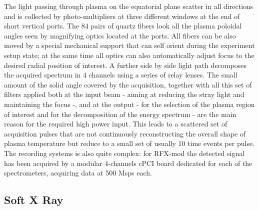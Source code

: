 The light passing through plasma on the equatorial plane scatter in all directions and is collected by photo-multipliers at three different windows at the end of short vertical ports. The 84 pairs of quartz fibers look all the plasma poloidal angles seen by magnifying optics located at the ports. All fibers can be also moved by a special mechanical support that can self orient during the experiment setup state; at the same time all optics can also automatically adjust focus to the desired radial position of interest.
A further side by side light path decomposes the acquired spectrum in 4 channels using a series of relay lenses.
%
The small amount of the solid angle covered by the acquisition, together with all this set of filters applied both at the input beam - aiming at reducing the stray light and maintaining the focus -, and at the output - for the selection of the plasma region of interest and for the decomposition of the energy spectrum - are the main reason for the required high power input.
%
This leads to a scattered set of acquisition pulses that are not continuously reconstructing the overall shape of plasma temperature but reduce to a small set of usually 10 time events per pulse.
%
The recording systems is also quite complex: for RFX-mod the detected signal has been acquired by a modular 4-channels cPCI board dedicated for each of the spectrometers, acquiring data at 500 Msps each.

\subsection{Soft X Ray}


